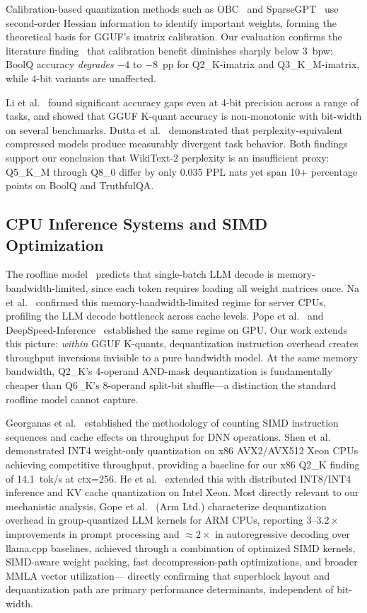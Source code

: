 \documentclass[conference]{IEEEtran}
\begin{document}
Calibration-based quantization methods such as OBC~\cite{obc} and
SparseGPT~\cite{sparsegpt} use second-order Hessian information to identify
important weights, forming the theoretical basis for GGUF's imatrix calibration.
Our evaluation confirms the literature finding~\cite{dettmers_kbit} that calibration
benefit diminishes sharply below 3~bpw: BoolQ accuracy \emph{degrades} $-4$ to $-8$~pp
for Q2\_K-imatrix and Q3\_K\_M-imatrix, while 4-bit variants are unaffected.

Li et al.~\cite{li_eval} found significant accuracy gaps even at 4-bit
precision across a range of tasks, and showed that GGUF K-quant accuracy is
non-monotonic with bit-width on several benchmarks.
Dutta et al.~\cite{dutta_accuracy} demonstrated that perplexity-equivalent compressed
models produce measurably divergent task behavior.
Both findings support our conclusion that WikiText-2 perplexity is an insufficient
proxy: Q5\_K\_M through Q8\_0 differ by only 0.035 PPL nats yet span 10+ percentage
points on BoolQ and TruthfulQA.

\subsection{CPU Inference Systems and SIMD Optimization}

The roofline model~\cite{williams_roofline} predicts that single-batch LLM decode is
memory-bandwidth-limited, since each token requires loading all weight matrices once.
Na et al.~\cite{na_cpu_perf} confirmed this memory-bandwidth-limited regime for
server CPUs, profiling the LLM decode bottleneck across cache levels.
Pope et al.~\cite{pope_efficiently_scaling} and DeepSpeed-Inference~\cite{deepspeed}
established the same regime on GPU.
Our work extends this picture: \emph{within} GGUF K-quants, dequantization instruction
overhead creates throughput inversions invisible to a pure bandwidth model.
At the same memory bandwidth, Q2\_K's 4-operand AND-mask dequantization is
fundamentally cheaper than Q6\_K's 8-operand split-bit shuffle---a distinction
the standard roofline model cannot capture.

Georganas et al.~\cite{georganas_simd} established the methodology of counting SIMD
instruction sequences and cache effects on throughput for DNN operations.
Shen et al.~\cite{shen_llm_cpu} demonstrated INT4 weight-only quantization on x86
AVX2/AVX512 Xeon CPUs achieving competitive throughput, providing a baseline for
our x86 Q2\_K finding of 14.1~tok/s at ctx=256.
He et al.~\cite{he_cpu_inference} extended this with distributed INT8/INT4 inference
and KV cache quantization on Intel Xeon.
Most directly relevant to our mechanistic analysis, Gope et al.~\cite{gope_arm_kernels}
(Arm Ltd.) characterize dequantization overhead in group-quantized LLM kernels for
ARM CPUs, reporting $3$--$3.2\times$ improvements in prompt processing and
${\approx}2\times$ in autoregressive decoding over llama.cpp baselines,
achieved through a combination of optimized SIMD kernels, SIMD-aware weight packing,
fast decompression-path optimizations, and broader MMLA vector utilization---
directly confirming that superblock layout and dequantization path are primary
performance determinants, independent of bit-width.
\end{document}
